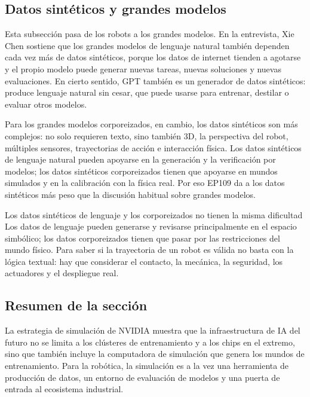 \subsection{Datos sintéticos y grandes modelos}

Esta subsección pasa de los robots a los grandes modelos. En la entrevista, Xie Chen sostiene que los grandes modelos de lenguaje natural también dependen cada vez más de datos sintéticos, porque los datos de internet tienden a agotarse y el propio modelo puede generar nuevas tareas, nuevas soluciones y nuevas evaluaciones. En cierto sentido, GPT también es un generador de datos sintéticos: produce lenguaje natural sin cesar, que puede usarse para entrenar, destilar o evaluar otros modelos.

Para los grandes modelos corporeizados, en cambio, los datos sintéticos son más complejos: no solo requieren texto, sino también 3D, la perspectiva del robot, múltiples sensores, trayectorias de acción e interacción física. Los datos sintéticos de lenguaje natural pueden apoyarse en la generación y la verificación por modelos; los datos sintéticos corporeizados tienen que apoyarse en mundos simulados y en la calibración con la física real. Por eso EP109 da a los datos sintéticos más peso que la discusión habitual sobre grandes modelos.

\begin{warningbox}{Los datos sintéticos de lenguaje y los corporeizados no tienen la misma dificultad}
Los datos de lenguaje pueden generarse y revisarse principalmente en el espacio simbólico; los datos corporeizados tienen que pasar por las restricciones del mundo físico. Para saber si la trayectoria de un robot es válida no basta con la lógica textual: hay que considerar el contacto, la mecánica, la seguridad, los actuadores y el despliegue real.
\end{warningbox}

\subsection{Resumen de la sección}

La estrategia de simulación de NVIDIA muestra que la infraestructura de IA del futuro no se limita a los clústeres de entrenamiento y a los chips en el extremo, sino que también incluye la computadora de simulación que genera los mundos de entrenamiento. Para la robótica, la simulación es a la vez una herramienta de producción de datos, un entorno de evaluación de modelos y una puerta de entrada al ecosistema industrial.
